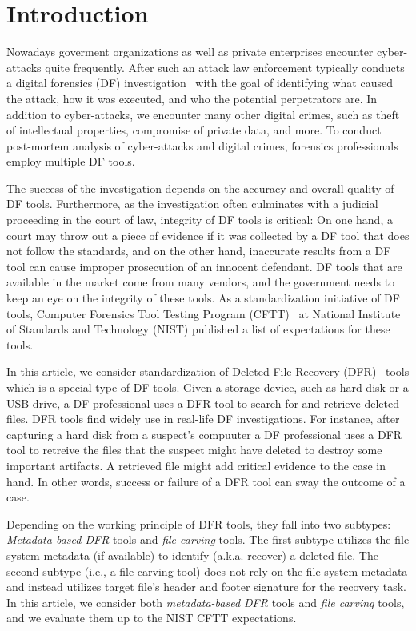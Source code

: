 \section{Introduction}\label{intro}

Nowadays goverment organizations as well as private enterprises encounter cyber-attacks quite frequently.
After such an attack law enforcement typically conducts a digital forensics (DF) investigation~\cite{df:news} \morecite 
with the goal of identifying what caused the attack, how it was executed, and who the potential perpetrators are. 
In addition to cyber-attacks, we encounter many other digital crimes, such as theft of intellectual properties, 
compromise of private data, and more. To conduct post-mortem analysis of cyber-attacks and digital crimes, forensics professionals
employ multiple DF tools. 

The success of the investigation depends on the accuracy and overall quality of DF tools.
Furthermore, as the investigation often culminates with a judicial proceeding in the court of law, integrity of DF tools 
is critical: On one hand, a court may throw out a piece of evidence if it was collected by a DF tool that does not follow the standards, 
and on the other hand, inaccurate results from a DF tool can cause improper prosecution of an innocent defendant. 
DF tools that are available in the market come from many vendors, and the government needs to keep an eye on the integrity of these tools. 
As a standardization initiative of DF tools,  Computer Forensics Tool Testing Program (CFTT)~\cite{cftt:nist} 
at National Institute of Standards and Technology (NIST) published a list of expectations for these tools. 

In this article, we consider standardization of Deleted File Recovery (DFR)~\cite{meta:dfr:standards} \morecite tools which is a special type of DF tools. 
Given a storage device, such as hard disk or a USB drive, a DF professional uses a DFR tool to search for and retrieve deleted files.
DFR tools find widely use in real-life DF investigations. For instance, after capturing a hard disk from a suspect's compuuter a
DF professional uses a DFR tool to retreive the files that the suspect might have deleted to destroy some important artifacts.
A retrieved file might add critical evidence to the case in hand. In other words, success or failure of a DFR tool can sway the outcome of a case.

Depending on the working principle of DFR tools, they fall into two subtypes: \emph{Metadata-based DFR} tools and \emph{file carving} tools.
The first subtype utilizes the file system metadata (if available) to identify (a.k.a. recover) a deleted file. 
The second subtype (i.e., a file carving tool) does not rely on the file system metadata and instead utilizes target file's 
header and footer signature for the recovery task. 
In this article, we consider both \emph{metadata-based DFR} tools and \emph{file carving} tools, and we evaluate them up to the NIST CFTT expectations.       

